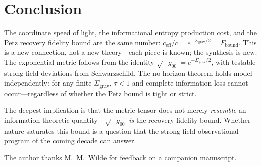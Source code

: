 \documentclass[prl,twocolumn,superscriptaddress,floatfix,nofootinbib]{revtex4-2}
\newcommand{\tauasym}{\tau}
\newcommand{\ceff}{c_{\mathrm{eff}}}
\newcommand{\Sgrav}{\Sigma_{\mathrm{grav}}}
\newcommand{\Fbound}{F_{\mathrm{bound}}}
\begin{document}
\section{Conclusion}

The coordinate speed of light, the informational entropy
production cost, and the Petz recovery fidelity bound
are the same number:
$\ceff/c = e^{-\Sgrav/2} = \Fbound$.
This is a new connection, not a new theory---each piece
is known; the synthesis is new.
The exponential metric follows from the identity
$\sqrt{-g_{00}} = e^{-\Sgrav/2}$, with testable
strong-field deviations from Schwarzschild.
The no-horizon theorem holds model-independently:
for any finite $\Sgrav$, $\tauasym < 1$ and complete
information loss cannot occur---regardless of whether
the Petz bound is tight or strict.

The deepest implication is that the metric tensor does
not merely \emph{resemble} an information-theoretic
quantity---$\sqrt{-g_{00}}$ \emph{is} the recovery
fidelity bound.
Whether nature saturates this bound is a question that
the strong-field observational program of the coming
decade can answer.

\begin{acknowledgments}
The author thanks M.~M.~Wilde for feedback on a
companion manuscript.
\end{acknowledgments}
\end{document}
